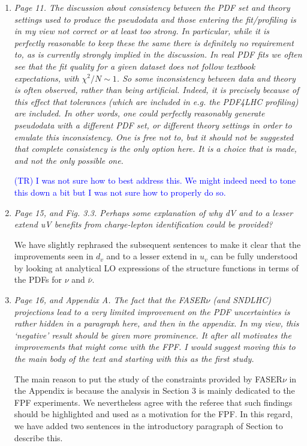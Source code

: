 \documentclass[11pt,a4paper]{article}
\begin{document}
\begin{enumerate}
	\item {\it Page 11. The discussion about consistency between the PDF set and theory settings
		used to produce the pseudodata and those entering the fit/profiling is in my view not
		correct or at least too strong. In particular, while it is perfectly reasonable to keep
		these the same there is definitely no requirement to, as is currently strongly implied in
		the discussion. In real PDF fits we often see that the fit quality for a given dataset does
		not follow textbook expectations, with $\chi^2/N \sim 1$. So some inconsistency between data
		and theory is often observed, rather than being artificial. Indeed, it is precisely because
		of this effect that tolerances (which are included in e.g. the PDF4LHC profiling) are
		included. In other words, one could perfectly reasonably generate pseudodata with a
		different PDF set, or different theory settings in order to emulate this inconsistency.
		One is free not to, but it should not be suggested that complete consistency is the only
		option here. It is a choice that is made, and not the only possible one.
	}
	
	\textcolor{blue}{(TR) I was not sure how to best address this. We might indeed need to tone this down
	a bit but I was not sure how to properly do so.}
	
	\item {\it Page 15, and Fig. 3.3. Perhaps some explanation of why dV and to a lesser extend uV
		benefits from charge-lepton identification could be provided?
	}
	
	We have slightly rephrased the subsequent sentences to make it clear that the improvements
	seen in $d_v$ and to a lesser extend in $u_v$ can be fully understood by looking at analytical 
	LO expressions of the structure functions in terms of the PDFs for $\nu$ and $\bar{\nu}$.
	
	\item {\it Page 16, and Appendix A. The fact that the FASER$\nu$ (and SNDLHC) projections lead
		to a very limited improvement on the PDF uncertainties is rather hidden in a paragraph
		here, and then in the appendix. In my view, this ‘negative’ result should be given more
		prominence. It after all motivates the improvements that might come with the FPF. I
		would suggest moving this to the main body of the text and starting with this as the
		first study.
	}
	
	The main reason to put the study of the constraints provided by FASER$\nu$ in the Appendix is because
	the analysis in Section 3 is mainly dedicated to the FPF experiments. We nevertheless agree with the
	referee that such findings should be highlighted and used as a motivation for the FPF. In this regard, we
	have added two sentences in the introductory paragraph of Section to describe this.
	

\end{enumerate}
\end{document}
